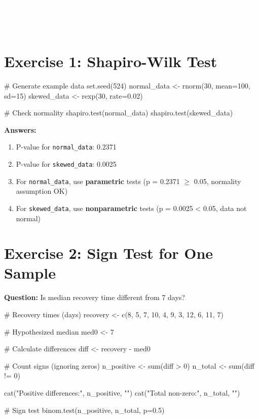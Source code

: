\documentclass[11pt]{article}
\title{}
\author{}
\date{}
\begin{document}
\begin{tcolorbox}[colback=osaorange,colframe=black,boxrule=2pt,arc=0pt,left=3pt,right=3pt,top=6pt,bottom=6pt,boxsep=2pt]
\centering
\textcolor{white}{\textbf{\Large H524 Introduction to Biostatistics}}\\
\textcolor{white}{\textbf{\Large Week 7 Lab: Nonparametric Methods - ANSWER KEY}}\\
\textcolor{white}{\textbf{\Large Fall 2025}}
\end{tcolorbox}

\vspace{8pt}

\section{Exercise 1: Shapiro-Wilk Test}

\begin{rcode}
# Generate example data
set.seed(524)
normal_data <- rnorm(30, mean=100, sd=15)
skewed_data <- rexp(30, rate=0.02)

# Check normality
shapiro.test(normal_data)
shapiro.test(skewed_data)
\end{rcode}

\textbf{Answers:}
\begin{enumerate}
\item \textcolor{answergreen}{P-value for \texttt{normal\_data}: 0.2371}
\item \textcolor{answergreen}{P-value for \texttt{skewed\_data}: 0.0025}
\item \textcolor{answergreen}{For \texttt{normal\_data}, use \textbf{parametric} tests (p = 0.2371 $\geq$ 0.05, normality assumption OK)}
\item \textcolor{answergreen}{For \texttt{skewed\_data}, use \textbf{nonparametric} tests (p = 0.0025 < 0.05, data not normal)}
\end{enumerate}

\section{Exercise 2: Sign Test for One Sample}

\textbf{Question:} Is median recovery time different from 7 days?

\begin{rcode}
# Recovery times (days)
recovery <- c(8, 5, 7, 10, 4, 9, 3, 12, 6, 11, 7)

# Hypothesized median
med0 <- 7

# Calculate differences
diff <- recovery - med0

# Count signs (ignoring zeros)
n_positive <- sum(diff > 0)
n_total <- sum(diff != 0)

cat("Positive differences:", n_positive, "\n")
cat("Total non-zero:", n_total, "\n")

# Sign test
binom.test(n_positive, n_total, p=0.5)
\end{rcode}
\end{document}
